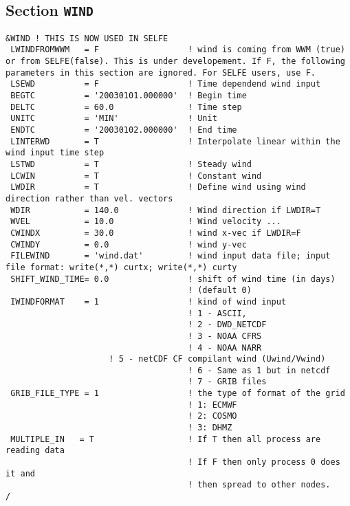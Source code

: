 \documentclass[12pt]{amsart}
\begin{document}
\subsection{Section {\tt WIND}}
\begin{verbatim}
&WIND ! THIS IS NOW USED IN SELFE
 LWINDFROMWWM   = F                  ! wind is coming from WWM (true) or from SELFE(false). This is under developement. If F, the following parameters in this section are ignored. For SELFE users, use F.
 LSEWD          = F                  ! Time dependend wind input
 BEGTC          = '20030101.000000'  ! Begin time
 DELTC          = 60.0               ! Time step
 UNITC          = 'MIN'              ! Unit
 ENDTC          = '20030102.000000'  ! End time
 LINTERWD       = T                  ! Interpolate linear within the wind input time step
 LSTWD          = T                  ! Steady wind
 LCWIN          = T                  ! Constant wind
 LWDIR          = T                  ! Define wind using wind direction rather than vel. vectors
 WDIR           = 140.0              ! Wind direction if LWDIR=T
 WVEL           = 10.0               ! Wind velocity ...
 CWINDX         = 30.0               ! wind x-vec if LWDIR=F
 CWINDY         = 0.0                ! wind y-vec
 FILEWIND       = 'wind.dat'         ! wind input data file; input file format: write(*,*) curtx; write(*,*) curty
 SHIFT_WIND_TIME= 0.0                ! shift of wind time (in days)
                                     ! (default 0)
 IWINDFORMAT    = 1                  ! kind of wind input
                                     ! 1 - ASCII,
                                     ! 2 - DWD_NETCDF
                                     ! 3 - NOAA CFRS
                                     ! 4 - NOAA NARR
				     ! 5 - netCDF CF compilant wind (Uwind/Vwind)
                                     ! 6 - Same as 1 but in netcdf
                                     ! 7 - GRIB files
 GRIB_FILE_TYPE = 1                  ! the type of format of the grid
                                     ! 1: ECMWF
                                     ! 2: COSMO
                                     ! 3: DHMZ
 MULTIPLE_IN   = T                   ! If T then all process are reading data
                                     ! If F then only process 0 does it and
                                     ! then spread to other nodes.
/
\end{verbatim}
\end{document}
